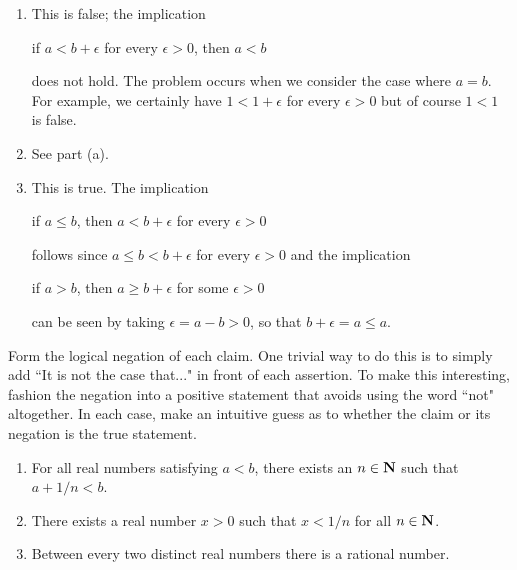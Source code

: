 \documentclass{lew98_solutions}
\begin{document}
\begin{solution}
    \begin{enumerate}
        \item This is false; the implication
        \begin{center}
            if \( a < b + \epsilon \) for every \( \epsilon > 0 \), then \( a < b \)
        \end{center}
        does not hold. The problem occurs when we consider the case where \( a = b \). For example, we certainly have \( 1 < 1 + \epsilon \) for every \( \epsilon > 0 \) but of course \( 1 < 1 \) is false.

        \item See part (a).

        \item This is true. The implication
        \begin{center}
            if \( a \leq b \), then \( a < b + \epsilon \) for every \( \epsilon > 0 \)
        \end{center}
        follows since \( a \leq b < b + \epsilon \) for every \( \epsilon > 0 \) and the implication
        \begin{center}
            if \( a > b \), then \( a \geq b + \epsilon \) for some \( \epsilon > 0 \)
        \end{center}
        can be seen by taking \( \epsilon = a - b > 0 \), so that \( b + \epsilon = a \leq a \).
    \end{enumerate}
\end{solution}

\begin{exercise}
\label{ex:1.2.11}
    Form the logical negation of each claim. One trivial way to do this is to simply add ``It is not the case that..." in front of each assertion. To make this interesting, fashion the negation into a positive statement that avoids using the word ``not" altogether. In each case, make an intuitive guess as to whether the claim or its negation is the true statement.
    \begin{enumerate}
        \item For all real numbers satisfying \( a < b \), there exists an \( n \in \mathbf{N} \) such that \( a + 1/n < b \).

        \item There exists a real number \( x > 0 \) such that \( x < 1/n \) for all \( n \in \mathbf{N} \).

        \item Between every two distinct real numbers there is a rational number.
    \end{enumerate}
\end{exercise}
\end{document}
